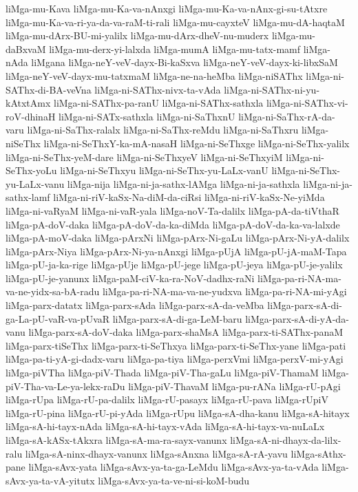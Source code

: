 {liMga-mu-Kava
liMga-mu-Ka-va-nAnxgi
liMga-mu-Ka-va-nAnx-gi-su-tAtxre
liMga-mu-Ka-va-ri-ya-da-va-raM-ti-rali
liMga-mu-cayxteV
liMga-mu-dA-haqtaM
liMga-mu-dArx-BU-mi-yalilx
liMga-mu-dArx-dheV-nu-muderx
liMga-mu-daBxvaM
liMga-mu-derx-yi-lalxda
liMga-mumA
liMga-mu-tatx-mamf
liMga-nAda
liMgana
liMga-neY-veV-dayx-Bi-kaSxva
liMga-neY-veV-dayx-ki-libxSaM
liMga-neY-veV-dayx-mu-tatxmaM
liMga-ne-na-heMba
liMga-niSAThx
liMga-ni-SAThx-di-BA-veVna
liMga-ni-SAThx-nivx-ta-vAda
liMga-ni-SAThx-ni-yu-kAtxtAmx
liMga-ni-SAThx-pa-ranU
liMga-ni-SAThx-sathxla
liMga-ni-SAThx-vi-roV-dhinaH
liMga-ni-SATx-sathxla
liMga-ni-SaThxnU
liMga-ni-SaThx-rA-da-varu
liMga-ni-SaThx-ralalx
liMga-ni-SaThx-reMdu
liMga-ni-SaThxru
liMga-niSeThx
liMga-ni-SeThxY-ka-mA-nasaH
liMga-ni-SeThxge
liMga-ni-SeThx-yalilx
liMga-ni-SeThx-yeM-dare
liMga-ni-SeThxyeV
liMga-ni-SeThxyiM
liMga-ni-SeThx-yoLu
liMga-ni-SeThxyu
liMga-ni-SeThx-yu-LaLx-vanU
liMga-ni-SeThx-yu-LaLx-vanu
liMga-nija
liMga-ni-ja-sathx-lAMga
liMga-ni-ja-sathxla
liMga-ni-ja-sathx-lamf
liMga-ni-riV-kaSx-Na-diM-da-ciRsi
liMga-ni-riV-kaSx-Ne-yiMda
liMga-ni-vaRyaM
liMga-ni-vaR-yala
liMga-noV-Ta-dalilx
liMga-pA-da-tiVthaR
liMga-pA-doV-daka
liMga-pA-doV-da-ka-diMda
liMga-pA-doV-da-ka-va-lalxde
liMga-pA-moV-daka
liMga-pArxNi
liMga-pArx-Ni-gaLu
liMga-pArx-Ni-yA-dalilx
liMga-pArx-Niya
liMga-pArx-Ni-ya-nAnxgi
liMga-pUjA
liMga-pU-jA-maM-Tapa
liMga-pU-ja-ka-rige
liMga-pUje
liMga-pU-jege
liMga-pU-jeya
liMga-pU-je-yalilx
liMga-pU-je-yanunx
liMga-paM-ciV-ka-ra-NoV-dadhx-raNi
liMga-pa-ri-NA-ma-va-ne-yidx-sa-bA-radu
liMga-pa-ri-NA-ma-va-ne-yudxva
liMga-pa-ri-NA-mi-yAgi
liMga-parx-datatx
liMga-parx-sAda
liMga-parx-sA-da-veMba
liMga-parx-sA-di-ga-La-pU-vaR-va-pUvaR
liMga-parx-sA-di-ga-LeM-baru
liMga-parx-sA-di-yA-da-vanu
liMga-parx-sA-doV-daka
liMga-parx-shaMsA
liMga-parx-ti-SAThx-panaM
liMga-parx-tiSeThx
liMga-parx-ti-SeThxya
liMga-parx-ti-SeThx-yane
liMga-pati
liMga-pa-ti-yA-gi-dadx-varu
liMga-pa-tiya
liMga-perxVmi
liMga-perxV-mi-yAgi
liMga-piVTha
liMga-piV-Thada
liMga-piV-Tha-gaLu
liMga-piV-ThamaM
liMga-piV-Tha-va-Le-ya-lekx-raDu
liMga-piV-ThavaM
liMga-pu-rANa
liMga-rU-pAgi
liMga-rUpa
liMga-rU-pa-dalilx
liMga-rU-pasayx
liMga-rU-pava
liMga-rUpiV
liMga-rU-pina
liMga-rU-pi-yAda
liMga-rUpu
liMga-sA-dha-kanu
liMga-sA-hitayx
liMga-sA-hi-tayx-nAda
liMga-sA-hi-tayx-vAda
liMga-sA-hi-tayx-va-nuLaLx
liMga-sA-kASx-tAkxra
liMga-sA-ma-ra-sayx-vanunx
liMga-sA-ni-dhayx-da-lilx-ralu
liMga-sA-ninx-dhayx-vanunx
liMga-sAnxna
liMga-sA-rA-yavu
liMga-sAthx-pane
liMga-sAvx-yata
liMga-sAvx-ya-ta-ga-LeMdu
liMga-sAvx-ya-ta-vAda
liMga-sAvx-ya-ta-vA-yitutx
liMga-sAvx-ya-ta-ve-ni-si-koM-budu
}
